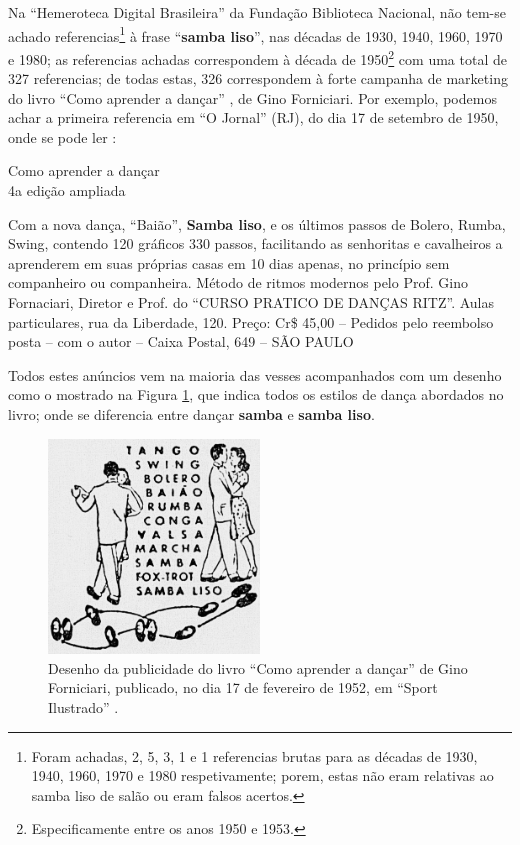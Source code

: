 \begin{description}
Na ``Hemeroteca Digital Brasileira'' da Fundação Biblioteca Nacional,
não tem-se achado referencias\footnote{ Foram achadas,
2, 5, 3, 1 e 1 referencias brutas para as décadas de 1930, 1940, 1960, 1970 e 1980 respetivamente;
porem, estas não eram relativas ao samba liso de salão ou eram falsos acertos.} 
à frase ``\textbf{samba liso}'', nas décadas de 1930, 1940, 1960, 1970 e 1980;
as referencias achadas correspondem à década de 1950\footnote{Especificamente entre os anos 1950 e 1953.}  
com uma total de 327 referencias;
de todas estas, 326 correspondem à forte campanha 
de marketing do livro
``Como aprender a dançar'' , 
de Gino Forniciari. 
Por exemplo, podemos achar a primeira referencia em ``O Jornal'' (RJ),
do dia 17 de setembro de 1950, onde se pode ler \cite[3ra seção pp. 9]{jornalanunciodanca1}:
\begin{citando}
\begin{center}
Como aprender a dançar\\
4a edição ampliada
\end{center}
Com a nova dança, ``Baião'', \textbf{Samba liso}, e os
últimos passos de Bolero, Rumba, Swing, contendo
120 gráficos 330 passos, facilitando as senhoritas 
e cavalheiros a aprenderem em suas próprias 
casas em 10 dias apenas, no princípio sem
companheiro ou companheira. Método de ritmos modernos
pelo Prof. Gino Fornaciari, 
Diretor e Prof. do ``CURSO PRATICO DE DANÇAS RITZ''.
Aulas particulares, rua da Liberdade, 120.
Preço: Cr\$ 45,00 -- Pedidos pelo reembolso posta 
-- com o autor -- Caixa Postal, 649 -- SÃO PAULO 
\end{citando}
Todos estes anúncios vem na maioria das vesses acompanhados com um desenho como
o mostrado na Figura \ref{fig:desenholivrodanca1}, que indica todos os estilos de dança abordados no livro;
onde se diferencia entre dançar \textbf{samba} e \textbf{samba liso}.
\begin{figure}[h]
  \centering
    \includegraphics[width=0.5\textwidth]{chapters/cap-historia-musicasamba/comoaprenderdancar.jpg}
  \caption{Desenho da publicidade do livro ``Como aprender a dançar'' de Gino Forniciari,
publicado, no dia 17 de fevereiro de 1952, em ``Sport Ilustrado'' \cite[pp. 22]{sportlivropublidanca}.}
\label{fig:desenholivrodanca1}
\end{figure}




\end{description}
